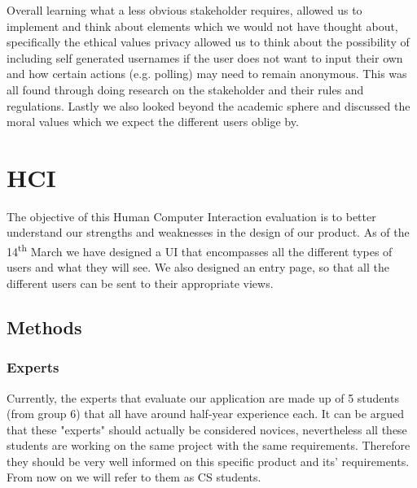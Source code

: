 \documentclass{article}
\begin{document}
    Overall learning what a less obvious stakeholder requires, allowed us to implement and think about elements which we would not have thought about, specifically the ethical values privacy allowed us to think about the possibility of including self generated usernames if the user does not want to input their own and how certain actions (e.g. polling) may need to remain anonymous. This was all found through doing research on the stakeholder and their rules and regulations. Lastly we also looked beyond the academic sphere and discussed the moral values which we expect the different users oblige by.\\



    \section{HCI}

    The objective of this Human Computer Interaction evaluation is to better understand our strengths and weaknesses in the design of our product. As of the 14\textsuperscript{th} March we have designed a UI that encompasses all the different types of users and what they will see. We also designed an entry page, so that all the different users can be sent to their appropriate views.\\

    \subsection{Methods}
    \subsubsection{Experts}
    Currently, the experts that evaluate our application are made up of 5 students (from group 6) that all have around half-year experience each. It can be argued that these "experts" should actually be considered novices, nevertheless all these students are working on the same project with the same requirements. Therefore they should be very well informed on this specific product and its' requirements. From now on we will refer to them as CS students.\\
\end{document}
